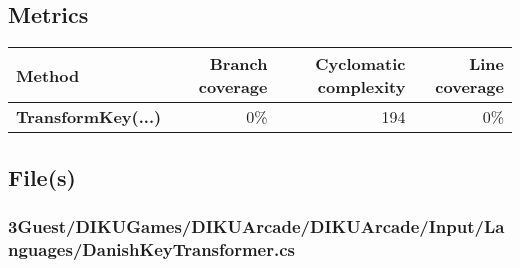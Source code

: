 \documentclass[a4paper,landscape,10pt]{article}
\begin{document}
\subsection{Metrics}
\begin{longtable}[l]{|l|r|r|r|}
\hline
\textbf{Method} & \textbf{Branch coverage} & \textbf{Cyclomatic complexity} & \textbf{Line coverage}\\
\hline
\textbf{TransformKey(...)} & 0\% & 194 & 0\%\\
\hline
\end{longtable}
\subsection{File(s)}
\subsubsection{3Guest/DIKUGames/DIKUArcade/DIKUArcade/Input/Languages/DanishKeyTransformer.cs}
\end{document}
